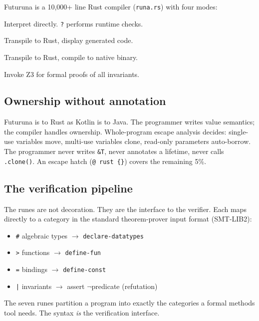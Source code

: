 \documentclass[11pt,a4paper]{article}
\begin{document}
Futuruna is a 10{,}000+ line Rust compiler (\texttt{runa.rs}) with four modes:

\begin{description}[nosep]
\item[\texttt{runa run file.runa}] Interpret directly. \texttt{?} performs runtime checks.
\item[\texttt{runa emit file.runa}] Transpile to Rust, display generated code.
\item[\texttt{runa build file.runa}] Transpile to Rust, compile to native binary.
\item[\texttt{runa verify file.runa}] Invoke Z3 for formal proofs of all invariants.
\end{description}

\subsection{Ownership without annotation}

Futuruna is to Rust as Kotlin is to Java. The programmer writes value semantics; the compiler handles ownership. Whole-program escape analysis decides: single-use variables move, multi-use variables clone, read-only parameters auto-borrow. The programmer never writes \texttt{\&T}, never annotates a lifetime, never calls \texttt{.clone()}. An escape hatch (\texttt{@ rust \{\}}) covers the remaining 5\%.

\subsection{The verification pipeline}

The runes are not decoration. They are the interface to the verifier. Each maps directly to a category in the standard theorem-prover input format (SMT-LIB2):

\begin{itemize}[nosep]
\item \texttt{\#} algebraic types $\to$ \texttt{declare-datatypes}
\item \texttt{>} functions $\to$ \texttt{define-fun}
\item \texttt{=} bindings $\to$ \texttt{define-const}
\item \texttt{|} invariants $\to$ assert $\neg$predicate (refutation)
\end{itemize}

The seven runes partition a program into exactly the categories a formal methods tool needs. The syntax \emph{is} the verification interface.
\end{document}
